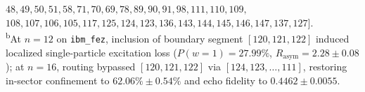 \documentclass[aps,pra,reprint,superscriptaddress,floatfix,nofootinbib]{revtex4-2}
\begin{document}
\begin{table}[t]
{\hspace*{3.2em}$48, 49, 50, 51, 58, 71, 70, 69, 78, 89, 90, 91, 98, 111, 110, 109,$\\
\hspace*{3.2em}$108, 107, 106, 105, 117, 125, 124, 123, 136, 143, 144, 145, 146, 147, 137, 127]$.\\
\textsuperscript{b}At $n = 12$ on \texttt{ibm\_fez}, inclusion of boundary segment $[120, 121, 122]$ induced localized single-particle excitation loss ($P(w=1) = 27.99\%$, $R_{\text{asym}} = 2.28 \pm 0.08$); at $n = 16$, routing bypassed $[120, 121, 122]$ via $[124, 123, \dots, 111]$, restoring in-sector confinement to $62.06\% \pm 0.54\%$ and echo fidelity to $0.4462 \pm 0.0055$.\par}
\end{table}
\end{document}
